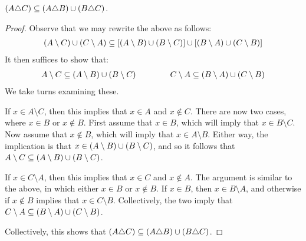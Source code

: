 \documentclass[12pt]{article}
\begin{document}
\begin{lemma}
  \(\left(A \triangle C\right)
          \subseteq \left(A \triangle B\right) \cup \left(B \triangle C\right)\).
\end{lemma}
\begin{proof}
  Observe that we may rewrite the above as follows:
  \begin{align*}
    \left(A \setminus C\right) \cup \left(C \setminus A\right)
      \subseteq
        \left[\left(A \setminus B\right) \cup \left(B \setminus C\right)\right] \cup
        \left[\left(B \setminus A\right) \cup \left(C \setminus B\right)\right]
  \end{align*}
  It then suffices to show that:
  \begin{align*}
    A \setminus C
      \subseteq \left(A \setminus B\right) \cup \left(B \setminus C\right)
    \qquad
    \qquad
    C \setminus A
      \subseteq \left(B \setminus A\right) \cup \left(C \setminus B\right)
  \end{align*}
  We take turns examining these.

      If \(x \in A \setminus C\), then this implies that \(x \in A\)
      and \(x \not\in C\).
      There are now two cases, where \(x \in B\) or \(x \not\in B\).
      First assume that \(x \in B\), which will imply that
      \(x \in B \setminus C\).
      Now assume that \(x \not\in B\), which will imply that
      \(x \in A \setminus B\).
      Either way, the implication is that
      \(x \in \left(A \setminus B\right) \cup \left(B \setminus C\right)\),
      and so it follows that
      \(A \setminus C
      \subseteq \left(A \setminus B\right) \cup \left(B \setminus C\right)\).

      If \(x \in C \setminus A\), then this implies that
      \(x \in C\) and \(x \not\in A\).
      The argument is similar to the above, in which either
      \(x \in B\) or \(x \not\in B\).
      If \(x \in B\), then \(x \in B \setminus A\),
      and otherwise if \(x \not\in B\) implies that
      \(x \in C \setminus B\).
      Collectively, the two imply that
      \(C \setminus A \subseteq
        \left(B \setminus A\right) \cup \left(C \setminus B\right)\).

  Collectively, this shows that
  \(\left(A \triangle C\right)
          \subseteq \left(A \triangle B\right) \cup \left(B \triangle C\right)\).
\end{proof}
\end{document}
